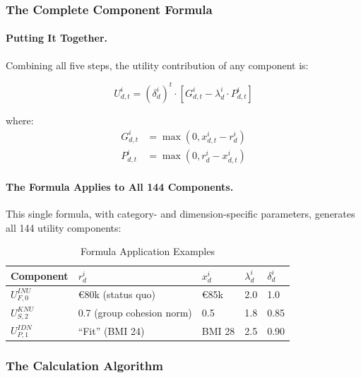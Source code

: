 \subsubsection{The Complete Component Formula}

\paragraph{Putting It Together.}
Combining all five steps, the utility contribution of any component is:

\begin{equation}
\boxed{
U^i_{d,t} = (\delta^i_d)^t \cdot \left[ G^i_{d,t} - \lambda^i_d \cdot P^i_{d,t} \right]
}
\label{eq:component-formula}
\end{equation}

where:
\begin{align*}
G^i_{d,t} &= \max(0, x^i_{d,t} - r^i_d) \\
P^i_{d,t} &= \max(0, r^i_d - x^i_{d,t})
\end{align*}

\paragraph{The Formula Applies to All 144 Components.}
This single formula, with category- and dimension-specific parameters,
generates all 144 utility components:

\begin{table}[htbp]
\centering
\caption{Formula Application Examples}
\label{tab:formula-examples}
\small
\renewcommand{\arraystretch}{1.2}
\begin{tabular}{@{}lllll@{}}
\toprule
\textbf{Component} & $r^i_d$ & $x^i_d$ & $\lambda^i_d$ & $\delta^i_d$ \\
\midrule
$U^{INU}_{F,0}$ & \euro{80k} (status quo) & \euro{85k} & 2.0 & 1.0 \\
$U^{KNU}_{S,2}$ & 0.7 (group cohesion norm) & 0.5 & 1.8 & 0.85 \\
$U^{IDN}_{P,1}$ & ``Fit'' (BMI 24) & BMI 28 & 2.5 & 0.90 \\
\bottomrule
\end{tabular}
\end{table}

\subsubsection{The Calculation Algorithm}

